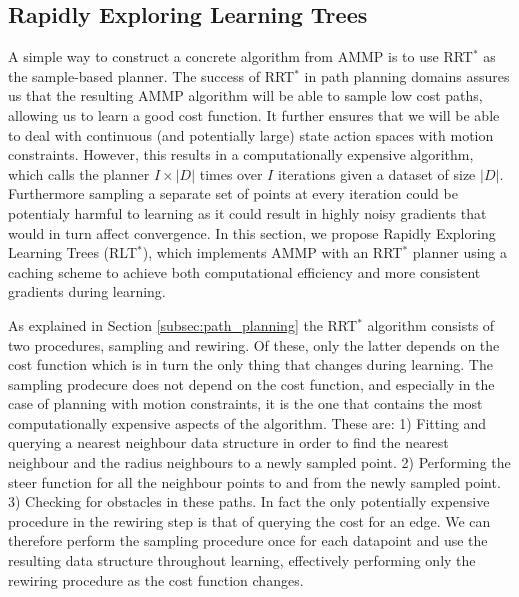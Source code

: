 \documentclass{article}  %
\begin{document}
\subsection{Rapidly Exploring Learning Trees \label{subsec:cached}}

A simple way to construct a concrete algorithm from AMMP is to use RRT$^*$ as the sample-based planner. The success of RRT$^*$ in path planning domains assures us that the resulting AMMP algorithm will be able to sample low cost paths, allowing us to learn a good cost function. It further ensures that we will be able to deal with continuous (and potentially large) state action spaces with motion constraints. However, this results in a computationally expensive algorithm, which calls the planner $I\times|D|$ times over $I$ iterations given a dataset of size $|D|$. Furthermore sampling a separate set of points at every iteration could be potentialy harmful to learning as it could result in highly noisy gradients that would in turn affect convergence. In this section, we propose Rapidly Exploring Learning Trees (RLT$^*$), which implements AMMP with an RRT$^*$ planner using a caching scheme to achieve both computational efficiency and more consistent gradients during learning.

As explained in Section \ref{subsec:path_planning} the RRT$^*$ algorithm consists of two procedures, sampling and rewiring. Of these, only the latter depends on the cost function which is in turn the only thing that changes during learning. The sampling prodecure does not depend on the cost function, and especially in the case of planning with motion constraints, it is the one that contains the most computationally expensive aspects of the algorithm. These are: 1) Fitting and querying a nearest neighbour data structure in order to find the nearest neighbour and the radius neighbours to a newly sampled point. 2) Performing the steer function for all the neighbour points to and from the newly sampled point. 3) Checking for obstacles in these paths. In fact the only potentially expensive procedure in the rewiring step is that of querying the cost for an edge. We can therefore perform the sampling procedure once for each datapoint and use the resulting data structure throughout learning, effectively performing only the rewiring procedure as the cost function changes.
\end{document}

